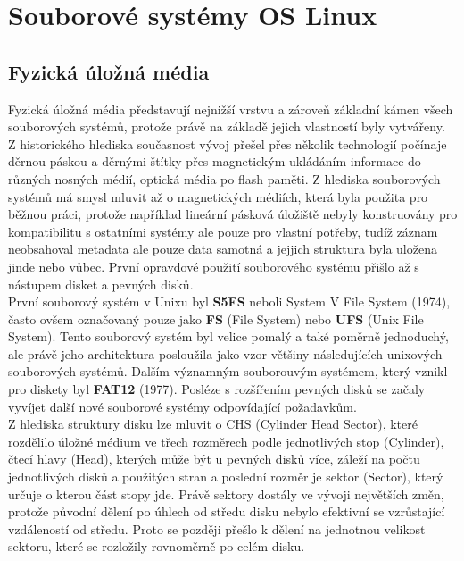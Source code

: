 \chapter{Souborové systémy OS Linux}

\section{Fyzická úložná média}
Fyzická úložná média představují nejnižší vrstvu  a zároveň základní kámen všech souborových systémů, protože právě na základě jejich vlastností byly vytvářeny.\\
Z historického hlediska současnost vývoj přešel přes několik technologií počínaje děrnou páskou a děrnými štítky přes magnetickým ukládáním informace do různých nosných médií, optická média po flash paměti. Z hlediska souborových systémů má smysl mluvit až o magnetických médiích, která byla použita pro běžnou práci, protože například lineární pásková úložiště nebyly konstruovány pro kompatibilitu s ostatními systémy ale pouze pro vlastní potřeby, tudíž záznam neobsahoval metadata ale pouze data samotná a jejjich struktura byla uložena jinde nebo vůbec. První opravdové použití souborového systému přišlo až s nástupem disket a pevných disků. \\
První souborový systém v Unixu byl \textbf{S5FS} neboli System V File System (1974), často ovšem označovaný pouze jako \textbf{FS} (File System) nebo \textbf{UFS} (Unix File System). Tento souborový systém byl velice pomalý a také poměrně jednoduchý, ale právě jeho architektura posloužila jako vzor většiny následujících unixových souborových systémů. Dalším významným souborouvým systémem, který vznikl pro diskety byl \textbf{FAT12} (1977). Posléze s rozšířením pevných disků se začaly vyvíjet další nové souborové systémy odpovídající požadavkům.\\
Z hlediska struktury disku lze mluvit o CHS (Cylinder Head Sector), které rozdělilo úložné médium ve třech rozměrech podle jednotlivých stop (Cylinder), čtecí hlavy (Head), kterých může být u pevných disků více, záleží na počtu jednotlivých disků a použitých stran a poslední rozměr je sektor (Sector), který určuje o kterou část stopy jde. Právě sektory dostály ve vývoji největších změn, protože původní dělení po úhlech od středu disku nebylo efektivní se vzrůstající vzdáleností od středu. Proto se později přešlo k dělení na jednotnou velikost sektoru, které se rozložily rovnoměrně po celém disku.\\

